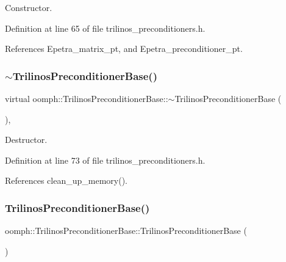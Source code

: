 Constructor. 



Definition at line 65 of file trilinos\+\_\+preconditioners.\+h.



References Epetra\+\_\+matrix\+\_\+pt, and Epetra\+\_\+preconditioner\+\_\+pt.

\mbox{\label{classoomph_1_1TrilinosPreconditionerBase_a5d82e0cefa29fee69f80fb376763e584}} 
\subsubsection{\texorpdfstring{$\sim$\+Trilinos\+Preconditioner\+Base()}{~TrilinosPreconditionerBase()}}
{\footnotesize\ttfamily virtual oomph\+::\+Trilinos\+Preconditioner\+Base\+::$\sim$\+Trilinos\+Preconditioner\+Base (\begin{DoxyParamCaption}{ }\end{DoxyParamCaption})\hspace{0.3cm}{\ttfamily [inline]}, {\ttfamily [virtual]}}



Destructor. 



Definition at line 73 of file trilinos\+\_\+preconditioners.\+h.



References clean\+\_\+up\+\_\+memory().

\mbox{\label{classoomph_1_1TrilinosPreconditionerBase_ae6354e67e90407bf538b7d7750719e67}} 
\subsubsection{\texorpdfstring{Trilinos\+Preconditioner\+Base()}{TrilinosPreconditionerBase()}\hspace{0.1cm}{\footnotesize\ttfamily [2/2]}}
{\footnotesize\ttfamily oomph\+::\+Trilinos\+Preconditioner\+Base\+::\+Trilinos\+Preconditioner\+Base (\begin{DoxyParamCaption}\item[{const \hyperlink{classoomph_1_1TrilinosPreconditionerBase}{Trilinos\+Preconditioner\+Base} \&}]{ }\end{DoxyParamCaption})\hspace{0.3cm}{\ttfamily [inline]}}



